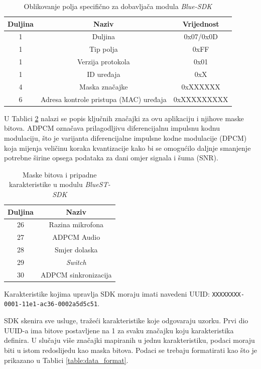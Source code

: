 \begin{table}[ht!]
	\centering
	\caption{Oblikovanje polja specifično za dobavljača modula \textit{Blue-SDK} \cite{bluest}}
	\begin{tabular}{|c| c| c|}
		\hline
		\rowcolor{lightblue}  
		\textbf{Duljina} & \textbf{Naziv} & \textbf{Vrijednost} \\ \hline
		1 & Duljina & 0x07/0x0D \\ \hline
		1 & Tip polja & 0xFF \\ \hline
		1 & Verzija protokola & 0x01 \\ \hline
		1 & ID uređaja & 0xX \\ \hline
		4 & Maska značajke & 0xXXXXXX \\ \hline
		6 & Adresa kontrole pristupa (MAC) uređaja & 0xXXXXXXXXX \\ \hline
	\end{tabular}
	\label{table:formatting}
\end{table}

U Tablici \ref{table:masks} nalazi se popis ključnih značajki za ovu aplikaciju i njihove maske bitova. ADPCM označava prilagodljivu diferencijalnu impulsnu kodnu modulaciju, što je varijanta diferencijalne impulsne kodne modulacije (DPCM) koja mijenja veličinu koraka kvantizacije kako bi se omogućilo daljnje smanjenje potrebne širine opsega podataka za dani omjer signala i šuma (SNR). 

\begin{table}[ht!]
	\centering
	\caption{Maske bitova i pripadne karakteristike u modulu \textit{BlueST-SDK} \cite{bluest}}
	\begin{tabular}{|c| c|}
		\hline
		\rowcolor{lightblue}  
		\textbf{Duljina} & \textbf{Naziv}  \\ \hline
		26 & Razina mikrofona \\ \hline
		27 & ADPCM Audio \\ \hline
		28 & Smjer dolaska \\ \hline
		29 & \textit{Switch} \\ \hline
		30 & ADPCM sinkronizacija  \\ \hline
	\end{tabular}
	\label{table:masks}
\end{table}

Karakteristike kojima upravlja SDK moraju imati navedeni UUID:
\newline \texttt{XXXXXXXX-0001-11e1-ac36-0002a5d5c51}. 

SDK skenira sve usluge, tražeći karakteristike koje odgovaraju uzorku. Prvi dio UUID-a ima bitove postavljene na 1 za svaku značajku koju karakteristika definira. U slučaju više značajki mapiranih u jednu karakteristiku, podaci moraju biti u istom redoslijedu kao maska bitova. Podaci se trebaju formatirati kao što je prikazano u Tablici \ref{table:data_format}.

